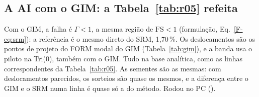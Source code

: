 \documentclass[11pt,a4paper]{article}
\begin{document}
\subsection{A AI com o GIM: a Tabela~\ref{tab:r05} refeita}\label{sec:aigim}
Com o GIM, a falha é $\Gamma < 1$, a mesma região de $\mathrm{FS} < 1$ (formulação, Eq.~\ref{F-eq:srm}): a referência é
o mesmo direto do SRM, 1{,}70\,\%. Os deslocamentos são os pontos de projeto do FORM modal do GIM
(Tabela~\ref{tab:gim}), e a banda usa o piloto na Tri(0), também com o GIM. Tudo na base analítica, como as linhas
correspondentes da Tabela~\ref{tab:r05}. As sementes são as mesmas: com deslocamentos parecidos, os sorteios são quase os
mesmos, e a diferença entre o GIM e o SRM numa linha é quase só a do método. Rodou no PC
().
\begin{table}[H]\centering\small
{}
\caption{A AI com o GIM e a do SRM correspondente (Tabela~\ref{tab:r05}), com a mesma semente. A dif. e o ganho são
contra o direto do SRM; nas de Nyström, a dif. é aproximada (Seção~\ref{sec:mesmavar}).}\label{tab:aigim}
\end{table}
\end{document}
